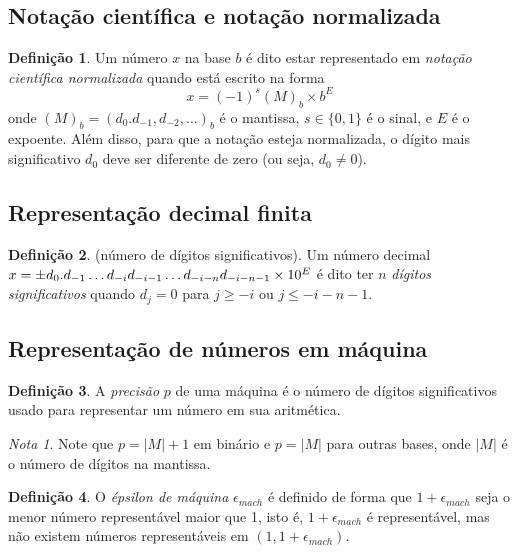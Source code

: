 \documentclass{article}
\theoremstyle{plain}
\theoremstyle{definition}
\newtheorem{defn}{Definição}[section]
\theoremstyle{remark}
\newtheorem*{rem}{Nota}
\begin{document}
\subsection{Notação científica e notação normalizada}

\begin{defn}
    Um número \(x\) na base \(b\) é dito estar representado em \emph{notação científica normalizada} quando está escrito na forma
    \begin{equation}
        x = (-1)^s (M)_b \times b^E
    \end{equation}
    onde \((M)_b = (d_0. d_{-1}, d_{-2}, \ldots)_b\) é o mantissa, \(s \in \{0, 1\}\) é o sinal, e \(E\) é o expoente. Além disso, para que a notação esteja normalizada, o dígito mais significativo \(d_0\) deve ser diferente de zero (ou seja, \(d_0 \neq 0\)).
\end{defn}

\subsection{Representação decimal finita}

\begin{defn} (número de dígitos significativos).
    Um número decimal \(x = \pm d_0. d_{-1}\ldots d_{-i}\linebreak d_{-i-1}\ldots d_{-i-n}d_{-i-n-1} \times 10^E\) é dito ter \(n\) \emph{dígitos significativos} quando \(d_j = 0\) para \(j \geq -i\) ou \(j \leq -i-n-1\).
\end{defn}

\subsection{Representação de números em máquina}

\begin{defn}
    A \emph{precisão} \(p\) de uma máquina é o número de dígitos significativos usado para representar um número em sua aritmética.
\end{defn}

\begin{rem}
    Note que \(p = \vert M \vert + 1\) em binário e \(p =\vert M \vert\) para outras bases, onde \(\vert M \vert\) é o número de dígitos na mantissa.
\end{rem}

\begin{defn}
    O \emph{épsilon de máquina} \(\epsilon_{mach}\) é definido de forma que \(1+\epsilon_{mach}\) seja o menor número representável maior que 1, isto é, \(1+\epsilon_{mach}\) é representável, mas não existem números representáveis em \((1, 1+\epsilon_{mach})\).
\end{defn}
\end{document}
